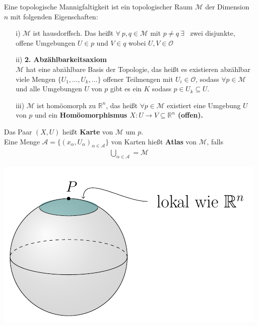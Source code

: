 \begin{defs}
Eine topologische Mannigfaltigkeit ist ein topologischer Raum $\mathcal{M}$ der Dimension $n$ mit folgenden Eigenschaften:
\begin{enumerate}
	\item[i)] $\mathcal{M}$ ist hausdorffsch. Das heißt $\forall \ p, q \in \mathcal{M}$ mit $p \neq q \  \exists$ \ zwei disjunkte, offene Umgebungen $U \in p$ und $V \in q$ wobei $U, V \in \mathcal{O}$
	\item[ii)] \textbf{2. Abzählbarkeitsaxiom}  \\
	$\mathcal{M}$ hat eine abzählbare Basis der Topologie, das heißt es existieren abzählbar viele Mengen $\{U_1, \dots, U_k, \dots\}$ offener Teilmengen mit $U_i \in \mathcal{O}$, sodass $\forall p \in \mathcal{M}$ und alle Umgebungen $U$ von $p$ gibt es ein $K$ sodass $p \in U_k \subseteq U$.
	\item [iii)] $\mathcal{M}$ ist homöomorph zu $\mathbb{R}^n$, das heißt $\forall p \in \mathcal{M}$ existiert eine Umgebung $U$ von $p$ und ein \bfseries Homöomorphismus \normalfont $X: U \rightarrow V \subseteq \mathbb{R}^n$ (offen).
\end{enumerate} 
\end{defs}
\begin{minipage}[H]{.8\textwidth}
\begin{defs}
	Das Paar $(X, U)$ heißt \textbf{Karte} von $\mathcal{M}$ um $p$. \\
	Eine Menge $\mathcal{A} = \{(x_{\alpha},U_{\alpha})_{\alpha \in \mathcal{A}}\}$ von Karten hießt \textbf{Atlas} von $\mathcal{M}$, falls \\
	\begin{align}
	\bigcup\limits_{\alpha \in \mathcal{A}} = \mathcal{M}
	\end{align}
\end{defs}
\end{minipage}
\hspace{1cm}
\begin{minipage}[H]{.2\textwidth}
\vspace{-0.5cm}
\includegraphics[scale=0.5]{figures/tikz/sphere_local_rn}
\end{minipage}


